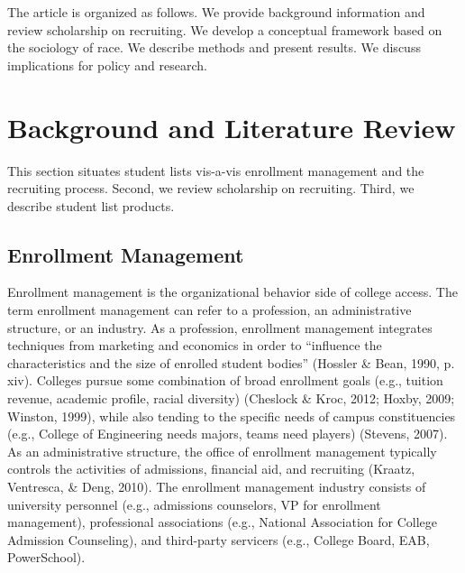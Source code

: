 \documentclass[
  12pt,
]{article}
\begin{document}
The article is organized as follows. We provide background information and review scholarship on recruiting. We develop a conceptual framework based on the sociology of race. We describe methods and present results. We discuss implications for policy and research.

\hypertarget{background-and-literature-review}{%
\section{Background and Literature Review}\label{background-and-literature-review}}

This section situates student lists vis-a-vis enrollment management and the recruiting process. Second, we review scholarship on recruiting. Third, we describe student list products.

\hypertarget{enrollment-management}{%
\subsection{Enrollment Management}\label{enrollment-management}}

Enrollment management is the organizational behavior side of college access. The term enrollment management can refer to a profession, an administrative structure, or an industry. As a profession, enrollment management integrates techniques from marketing and economics in order to ``influence the characteristics and the size of enrolled student bodies'' (Hossler \& Bean, 1990, p. xiv). Colleges pursue some combination of broad enrollment goals (e.g., tuition revenue, academic profile, racial diversity) (Cheslock \& Kroc, 2012; Hoxby, 2009; Winston, 1999), while also tending to the specific needs of campus constituencies (e.g., College of Engineering needs majors, teams need players) (Stevens, 2007). As an administrative structure, the office of enrollment management typically controls the activities of admissions, financial aid, and recruiting (Kraatz, Ventresca, \& Deng, 2010). The enrollment management industry consists of university personnel (e.g., admissions counselors, VP for enrollment management), professional associations (e.g., National Association for College Admission Counseling), and third-party servicers (e.g., College Board, EAB, PowerSchool).
\end{document}

